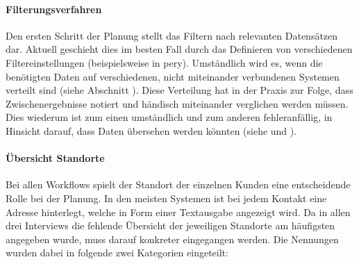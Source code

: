 \documentclass[Bachelorarbeit.tex]{subfiles}
\begin{document}
\paragraph{Filterungsverfahren}
\label{interviewsAnalyseFilterungsverfahren}
Den ersten Schritt der Planung stellt das Filtern nach relevanten Datensätzen dar.
Aktuell geschieht dies im besten Fall durch das Definieren von verschiedenen Filtereinstellungen (beispielsweise in pery).
Umständlich wird es, wenn die benötigten Daten auf verschiedenen, nicht miteinander verbundenen Systemen verteilt sind (siehe Abschnitt ). 
Diese Verteilung hat in der Praxis zur Folge, dass Zwischenergebnisse notiert und händisch miteinander verglichen werden müssen.
Dies wiederum ist zum einen umständlich und zum anderen fehleranfällig, in Hinsicht darauf, dass Daten übersehen werden könnten (siehe  und ).


\paragraph*{Übersicht Standorte}
\label{interviewsAnalyseStandorte}
Bei allen Workflows spielt der Standort der einzelnen Kunden eine entscheidende Rolle bei der Planung.
In den meisten Systemen ist bei jedem Kontakt eine Adresse hinterlegt, welche in Form einer Textausgabe angezeigt wird.
Da in allen drei Interviews die fehlende Übersicht der jeweiligen Standorte am häufigsten angegeben wurde, muss darauf konkreter eingegangen werden. 
Die Nennungen wurden dabei in folgende zwei Kategorien eingeteilt:
\end{document}
